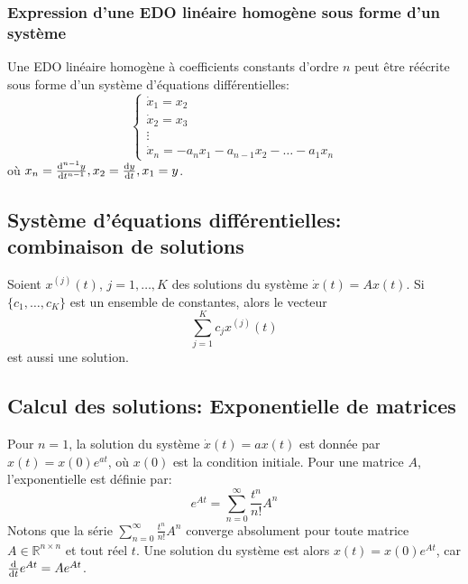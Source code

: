             \subsubsection{Expression d'une EDO linéaire homogène sous forme d'un système}
                Une EDO linéaire homogène à coefficients constants d'ordre $n$ peut être réécrite sous forme d'un système d'équations différentielles:
                \begin{equation}
                    \begin{cases}
                        \dot{x}_1=x_2 \\
                        \dot{x}_2=x_3 \\
                        \vdots \\
                        \dot{x}_n=-a_n x_1 - a_{n-1} x_2 - \dots - a_1 x_n
                    \end{cases}
                \end{equation}
                où $x_n=\frac {\mathrm d^{n-1}{y}}{\mathrm d{t}^{n-1}}, x_2=\frac {\mathrm d{y}}{\mathrm d{t}}, x_1=y$.
        
        \subsection{Système d'équations différentielles: combinaison de solutions}
            \begin{lemma}{} 
                Soient $x^{(j)}(t) $, $j=1, \ldots, K$ des solutions du système $\dot{x}(t)=Ax(t)$. Si $\{c_1, \ldots, c_K\}$ est un ensemble de constantes, alors le vecteur
                \begin{equation}
                    \sum_{j=1}^K c_j x^{(j)}(t)
                \end{equation}
                est aussi une solution.
            \end{lemma}
        
        \subsection{Calcul des solutions: Exponentielle de matrices}
            Pour $n=1 $, la solution du système $\dot{x}(t)=ax(t)$ est donnée par $x(t)=x(0) e^{at}$, où $x(0)$ est la condition initiale. Pour une matrice $A$, l'exponentielle est définie par:
            \begin{equation}
                e^{At}=\sum_{n=0}^{\infty} \frac{t^n}{n!} A^n
            \end{equation}
            Notons que la série $\sum_{n=0}^{\infty} \frac{t^n}{n!} A^n$ converge absolument pour toute matrice $A \in \mathbb{R}^{n\times n}$ et tout réel $t$.
            Une solution du système est alors $x(t)=x(0) e^{At}$, car $\frac {\mathrm d{}}{\mathrm d{t}}e^{At}=A e^{At}$.
        
